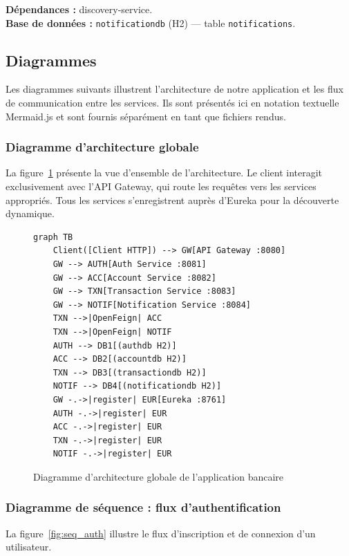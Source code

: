 \documentclass[12pt,a4paper]{article}
\begin{document}
\textbf{Dépendances :} discovery-service.\\
\textbf{Base de données :} \texttt{notificationdb} (H2) --- table \texttt{notifications}.


\subsection{Diagrammes}

Les diagrammes suivants illustrent l'architecture de notre application et les flux de communication entre les services. Ils sont présentés ici en notation textuelle Mermaid.js et sont fournis séparément en tant que fichiers rendus.

\subsubsection{Diagramme d'architecture globale}

La figure~\ref{fig:archi} présente la vue d'ensemble de l'architecture. Le client interagit exclusivement avec l'API Gateway, qui route les requêtes vers les services appropriés. Tous les services s'enregistrent auprès d'Eureka pour la découverte dynamique.

\begin{figure}[H]
\centering
\begin{verbatim}
graph TB
    Client([Client HTTP]) --> GW[API Gateway :8080]
    GW --> AUTH[Auth Service :8081]
    GW --> ACC[Account Service :8082]
    GW --> TXN[Transaction Service :8083]
    GW --> NOTIF[Notification Service :8084]
    TXN -->|OpenFeign| ACC
    TXN -->|OpenFeign| NOTIF
    AUTH --> DB1[(authdb H2)]
    ACC --> DB2[(accountdb H2)]
    TXN --> DB3[(transactiondb H2)]
    NOTIF --> DB4[(notificationdb H2)]
    GW -.->|register| EUR[Eureka :8761]
    AUTH -.->|register| EUR
    ACC -.->|register| EUR
    TXN -.->|register| EUR
    NOTIF -.->|register| EUR
\end{verbatim}
\caption{Diagramme d'architecture globale de l'application bancaire}
\label{fig:archi}
\end{figure}

\subsubsection{Diagramme de séquence : flux d'authentification}

La figure~\ref{fig:seq_auth} illustre le flux d'inscription et de connexion d'un utilisateur.
\end{document}
